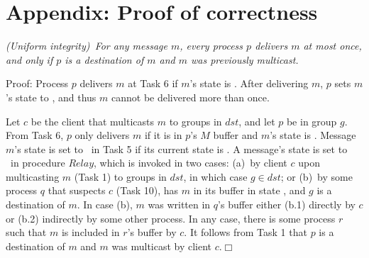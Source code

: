 
\newcommand{\Pend}{\ensuremath{\mathit{ToOrder}}\xspace}
\newcommand{\Done}{\ensuremath{\mathit{Ordered}}\xspace}
\newcommand{\Decided}{\ensuremath{\mathit{Decided}}\xspace}
\newcommand{\Buffer}{\ensuremath{\mathcal{B}}\xspace}

\clearpage
\section*{Appendix: Proof of correctness}

\begin{proposition}
\textit{(Uniform integrity)~For any message $m$, every process $p$ delivers $m$ at most once, and only if $p$ is a destination of $m$ and $m$ was previously multicast.}
\end{proposition}
\vspace{2mm}
\noindent
{\sc Proof:} 
Process $p$ delivers $m$ at Task 6 if $m$'s state is \ordered. 
After delivering $m$, $p$ sets $m$'s state to \done, and thus $m$ cannot be delivered more than once.

Let $c$ be the client that multicasts $m$ to groups in $dst$, and let $p$ be in group $g$. 
From Task 6, $p$ only delivers $m$ if it is in $p$'s $M$ buffer and $m$'s state is \ordered. 
Message $m$'s state is set to \ordered\ in Task 5 if its current state is \mcast.
A message's state is set to \mcast\ in procedure $Relay$, which is invoked in two cases:
(a)~by client $c$ upon multicasting $m$ (Task 1) to groups in $dst$, in which case $g \in dst$; or 
(b)~by some process $q$ that suspects $c$ (Task 10), has $m$ in its buffer in state \mcast, and $g$ is a destination of $m$.
In case (b), $m$ was written in $q$'s buffer either (b.1) directly by $c$ or (b.2) indirectly by some other process.
In any case, there is some process $r$ such that $m$ is included in $r$'s buffer by $c$.
It follows from Task 1 that $p$ is a destination of $m$ and $m$ was multicast by client $c$.\hfill$\Box$

